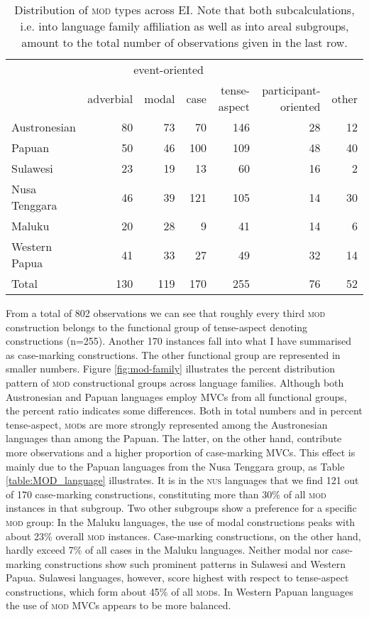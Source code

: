 \begin{table}


\begin{tabular}{lrrrrrr}
  \lsptoprule
& \multicolumn{4}{c|}{event-oriented} & & \\
 & {adverbial} & {modal} & {case} & {tense-aspect} & {participant-oriented} & {other}\\  
  \hline
  Austronesian & 80 & 73 & 70 & 146 & 28 & 12 \tabularnewline
  Papuan & 50 & 46 & 100 & 109 & 48 & 40 \tabularnewline
   \hline
  Sulawesi & 23 & 19 & 13 & 60 & 16 & 2 \tabularnewline
  Nusa Tenggara & 46 & 39 & 121 & 105 & 14 & 30 \tabularnewline
  Maluku & 20 & 28 & 9 & 41 & 14 & 6 \tabularnewline 
  Western Papua & 41 & 33 & 27 & 49 & 32 & 14 \tabularnewline 
\lsptoprule
Total & 130 & 119 & 170 & 255 & 76 & 52 \tabularnewline
\hline
\end{tabular}
\caption[Distribution of \textsc{mod} types across EI]{Distribution of \textsc{mod} types across EI. Note that both subcalculations, i.e. into language family affiliation as well as into areal subgroups,  amount to the total number of observations given in the last row.}
\label{table:MOD_overview}


\end{table}


From a total of 802 observations we can see that roughly every third \textsc{mod} construction belongs to the functional group of tense-aspect denoting constructions (n=255). Another 170 instances fall into what I have summarised as case-marking constructions. The other functional group are represented in smaller numbers. Figure \ref{fig:mod-family} illustrates the percent distribution pattern of \textsc{mod} constructional groups across language families. Although both Austronesian and Papuan languages employ MVCs from all functional groups, the percent ratio indicates some differences. Both in total numbers and in percent tense-aspect, \textsc{mod}s are more strongly represented among the Austronesian languages than among the Papuan. The latter, on the other hand, contribute more observations and a higher proportion of case-marking MVCs. This effect is mainly due to the Papuan languages from the Nusa Tenggara group, as Table \ref{table:MOD_language} illustrates. It is in the \textsc{nus} languages that we find 121 out of 170 case-marking constructions, constituting more than 30\% of all \textsc{mod} instances in that subgroup. Two other subgroups show a preference for a specific \textsc{mod} group: In the Maluku languages, the use of modal constructions peaks with about 23\% overall \textsc{mod} instances. Case-marking constructions, on the other hand, hardly exceed 7\% of all cases in the Maluku languages. Neither modal nor case-marking constructions show such prominent patterns in Sulawesi and Western Papua. Sulawesi languages, however, score highest with respect to tense-aspect constructions, which form about 45\% of all \textsc{mod}s. In Western Papuan languages the use of \textsc{mod} MVCs appears to be more balanced.

